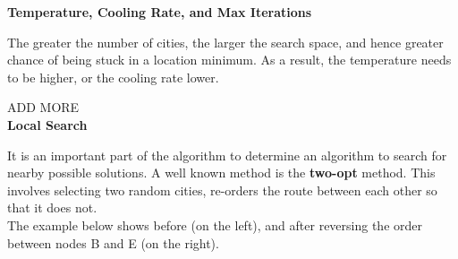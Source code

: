 \documentclass{article}
\begin{document}
\begin{figure}[!h]
    \centering
\end{figure}

\textbf{Temperature, Cooling Rate, and Max Iterations}

The greater the number of cities, the larger the search space, and hence greater chance of being stuck in a location minimum.
As a result, the temperature needs to be higher, or the cooling rate lower.

ADD MORE
\\

\textbf{Local Search}

It is an important part of the algorithm to determine an algorithm to search for nearby possible solutions.
A well known method is the \textbf{two-opt} method.
This involves selecting two random cities, re-orders the route between each other so that it does not.
\\

The example below shows before (on the left), and after reversing the order between nodes B and E (on the right).
\end{document}

